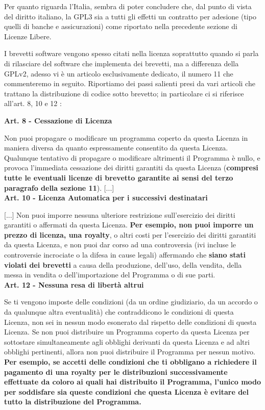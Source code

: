 Per quanto riguarda l'Italia, sembra di poter concludere che, dal punto di vista del diritto italiano, la GPL3 sia a tutti gli effetti un contratto per adesione (tipo quelli di banche e assicurazioni) come riportato nella precedente sezione di Licenze Libere.

I brevetti software vengono spesso citati nella licenza soprattutto quando si parla di rilasciare del software che implementa dei brevetti, ma a differenza della GPLv2, adesso vi è un articolo esclusivamente dedicato, il numero 11 che commenteremo in seguito. Riportiamo dei passi salienti presi da vari articoli che trattano la distribuzione di codice sotto brevetto; in particolare ci si riferisce all'art. 8, 10 e 12 :\\


\begin{scriptsize}
\textbf{Art. 8 - Cessazione di Licenza}

Non puoi propagare o modificare un programma coperto da questa Licenza in maniera diversa da quanto espressamente consentito da questa Licenza. Qualunque tentativo di propagare o modificare altrimenti il Programma è nullo, e provoca l'immediata cessazione dei diritti garantiti da questa Licenza (\textbf{compresi tutte le eventuali licenze di brevetto garantite ai sensi del terzo paragrafo della sezione 11}).
[...]\\

\textbf{Art. 10 - Licenza Automatica per i successivi destinatari}

[...]
Non puoi imporre nessuna ulteriore restrizione sull'esercizio dei diritti garantiti o affermati da questa Licenza. \textbf{Per esempio, non puoi imporre un prezzo di licenza, una royalty}, o altri costi per l'esercizio dei diritti garantiti da questa Licenza, e non puoi dar corso ad una controversia (ivi incluse le controversie incrociate o la difesa in cause legali) affermando che \textbf{siano stati violati dei brevetti} a causa della produzione, dell'uso, della vendita, della messa in vendita o dell'importazione del Programma o di sue parti.\\

\textbf{Art. 12 - Nessuna resa di libertà altrui}


Se ti vengono imposte delle condizioni (da un ordine giudiziario, da un accordo o da qualunque altra eventualità) che contraddicono le condizioni di questa Licenza, non sei in nessun modo esonerato dal rispetto delle condizioni di questa Licenza. Se non puoi distribuire un Programma coperto da questa Licenza per sottostare simultaneamente agli obblighi derivanti da questa Licenza e ad altri obblighi pertinenti, allora non puoi distribuire il Programma per nessun motivo. \textbf{Per esempio, se accetti delle condizioni che ti obbligano a richiedere il pagamento di una royalty per le distribuzioni successivamente effettuate da coloro ai quali hai distribuito il Programma, l'unico modo per soddisfare sia queste condizioni che questa Licenza è evitare del tutto la distribuzione del Programma.}\\


\end{scriptsize}


